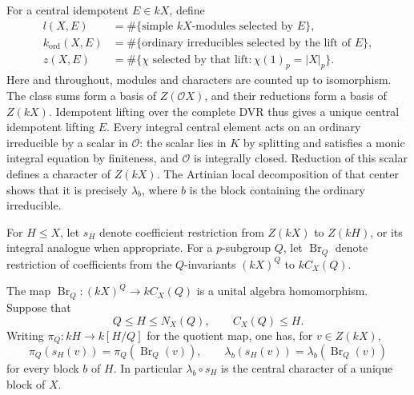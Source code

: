 For a central idempotent $E\in kX$, define
\begin{align*}
 l(X,E)&=\#\{\text{simple $kX$-modules selected by $E$}\},\\
 k_{\mathrm{ord}}(X,E)&=\#\{\text{ordinary irreducibles selected by the lift of $E$}\},\\
 z(X,E)&=\#\{\chi\text{ selected by that lift}:\chi(1)_p=|X|_p\}.
\end{align*}
Here and throughout, modules and characters are counted up to
isomorphism. The class sums form a basis of $Z(\mathcal O X)$, and
their reductions form a basis of $Z(kX)$. Idempotent lifting over the
complete DVR thus gives a unique central idempotent lifting $E$.
Every integral central element acts on an ordinary irreducible by
a scalar in $\mathcal O$: the scalar lies in $K$ by splitting and
satisfies a monic integral equation by finiteness, and $\mathcal O$
is integrally closed. Reduction of this scalar defines a character
of $Z(kX)$. The Artinian local decomposition of that center shows
that it is precisely $\lambda_b$, where $b$ is the block containing
the ordinary irreducible.

For $H\leq X$, let $s_H$ denote coefficient restriction from
$Z(kX)$ to $Z(kH)$, or its integral analogue when appropriate.
For a $p$-subgroup $Q$, let $\operatorname{Br}_Q$ denote restriction
of coefficients from the $Q$-invariants $(kX)^Q$ to $kC_X(Q)$.

\begin{lemma}\label{lem:normalizer-projection}
The map $\operatorname{Br}_Q:(kX)^Q\longrightarrow kC_X(Q)$ is a
unital algebra homomorphism. Suppose that
\[
 Q\leq H\leq N_X(Q),\qquad C_X(Q)\leq H.
\]
Writing $\pi_Q:kH\longrightarrow k[H/Q]$ for the quotient map, one
has, for $v\in Z(kX)$,
\begin{equation}\label{eq:normalizer-projection}
 \pi_Q(s_H(v))=\pi_Q(\operatorname{Br}_Q(v)),
 \qquad
 \lambda_b(s_H(v))=\lambda_b(\operatorname{Br}_Q(v))
\end{equation}
for every block $b$ of $H$. In particular $\lambda_b\circ s_H$ is
the central character of a unique block of $X$.
\end{lemma}

